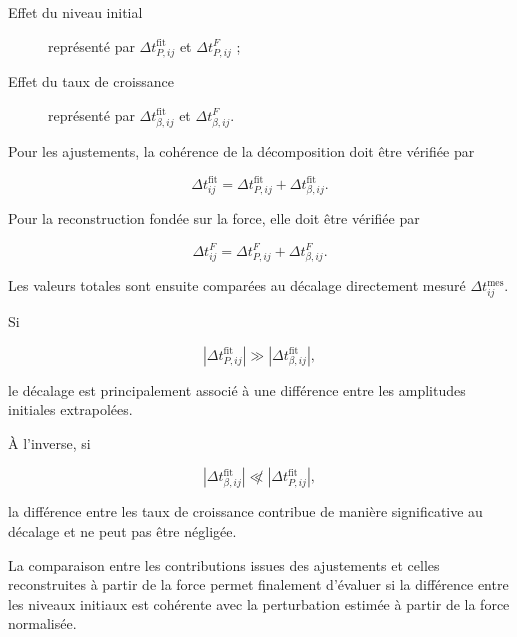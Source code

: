 \documentclass[
    11pt,
    a4paper
]{article}
\begin{document}
\begin{description}
    \item[Effet du niveau initial]
    représenté par
    \(\Delta t_{P,ij}^{\mathrm{fit}}\) et
    \(\Delta t_{P,ij}^{F}\) ;

    \item[Effet du taux de croissance]
    représenté par
    \(\Delta t_{\beta,ij}^{\mathrm{fit}}\) et
    \(\Delta t_{\beta,ij}^{F}\).
\end{description}

Pour les ajustements, la cohérence de la décomposition doit être vérifiée par

\begin{equation}
    \Delta t_{ij}^{\mathrm{fit}}
    =
    \Delta t_{P,ij}^{\mathrm{fit}}
    +
    \Delta t_{\beta,ij}^{\mathrm{fit}}.
    \label{eq:verification-decomposition-fit}
\end{equation}

Pour la reconstruction fondée sur la force, elle doit être vérifiée par

\begin{equation}
    \Delta t_{ij}^{F}
    =
    \Delta t_{P,ij}^{F}
    +
    \Delta t_{\beta,ij}^{F}.
    \label{eq:verification-decomposition-force}
\end{equation}

Les valeurs totales sont ensuite comparées au décalage directement mesuré
\(\Delta t_{ij}^{\mathrm{mes}}\).

Si

\begin{equation}
    \left|
        \Delta t_{P,ij}^{\mathrm{fit}}
    \right|
    \gg
    \left|
        \Delta t_{\beta,ij}^{\mathrm{fit}}
    \right|,
\end{equation}

le décalage est principalement associé à une différence entre les amplitudes
initiales extrapolées.

À l’inverse, si

\begin{equation}
    \left|
        \Delta t_{\beta,ij}^{\mathrm{fit}}
    \right|
    \not\ll
    \left|
        \Delta t_{P,ij}^{\mathrm{fit}}
    \right|,
\end{equation}

la différence entre les taux de croissance contribue de manière significative
au décalage et ne peut pas être négligée.

La comparaison entre les contributions issues des ajustements et celles
reconstruites à partir de la force permet finalement d’évaluer si la différence
entre les niveaux initiaux est cohérente avec la perturbation estimée à partir
de la force normalisée.
\end{document}
